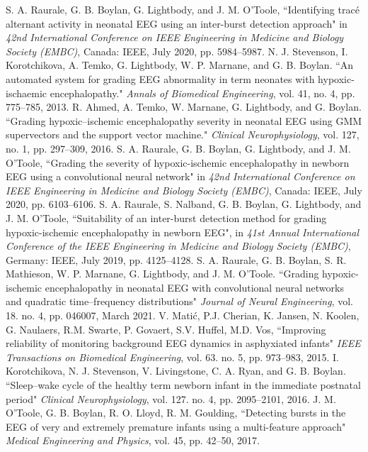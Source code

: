 \documentclass[conference]{IEEEtran}
\begin{document}
\begin{thebibliography}{99}
 S. A. Raurale, G. B. Boylan, G. Lightbody, and J. M. O'Toole, ``Identifying trac\'e alternant activity in neonatal EEG using an inter-burst detection approach" in \textit{42nd International Conference on IEEE Engineering in Medicine and Biology Society (EMBC)}, Canada: IEEE, July 2020, pp. 5984--5987.
 N. J. Stevenson, I. Korotchikova, A. Temko, G. Lightbody, W. P. Marnane, and G. B. Boylan. ``An automated system for grading EEG abnormality in term neonates with hypoxic-ischaemic encephalopathy." \textit{Annals of Biomedical Engineering}, vol. 41, no. 4, pp. 775--785, 2013.
 R. Ahmed, A. Temko, W. Marnane, G. Lightbody, and G. Boylan. ``Grading hypoxic–ischemic encephalopathy severity in neonatal EEG using GMM supervectors and the support vector machine." \textit{Clinical Neurophysiology}, vol. 127, no. 1, pp. 297--309, 2016.
 S. A. Raurale, G. B. Boylan, G. Lightbody, and J. M. O'Toole, ``Grading the severity of hypoxic-ischemic encephalopathy in newborn EEG using a convolutional neural network" in \textit{42nd International Conference on IEEE Engineering in Medicine and Biology Society (EMBC)}, Canada: IEEE, July 2020, pp. 6103--6106.
 S. A. Raurale, S. Nalband, G. B. Boylan, G. Lightbody, and J. M. O'Toole, ``Suitability of an inter-burst detection method for grading hypoxic-ischemic encephalopathy in newborn EEG", in \textit{41st Annual International Conference of the IEEE Engineering in Medicine and Biology Society (EMBC)}, Germany: IEEE, July 2019, pp. 4125--4128.
 S. A. Raurale, G. B. Boylan, S. R. Mathieson, W. P. Marnane, G. Lightbody, and J. M. O'Toole. ``Grading hypoxic-ischemic encephalopathy in neonatal EEG with convolutional neural networks and quadratic time–frequency distributions" \textit{Journal of Neural Engineering}, vol. 18. no. 4, pp. 046007, March 2021.
 V. Mati{\'c}, P.J. Cherian, K. Jansen, N. Koolen, G. Naulaers, R.M. Swarte, P. Govaert, S.V. Huffel, M.D. Vos, ``Improving reliability of monitoring background EEG dynamics in asphyxiated infants" \textit{IEEE Transactions on Biomedical Engineering}, vol. 63. no. 5, pp. 973--983, 2015.
 I. Korotchikova, N. J. Stevenson, V. Livingstone, C. A. Ryan, and G. B. Boylan. ``Sleep--wake cycle of the healthy term newborn infant in the immediate postnatal period" \textit{Clinical Neurophysiology}, vol. 127. no. 4, pp. 2095--2101, 2016.
 J. M. O’Toole, G. B. Boylan, R. O. Lloyd, R. M. Goulding, ``Detecting bursts in the EEG of very and extremely premature infants using a multi-feature approach" \textit{Medical Engineering and Physics}, vol. 45, pp. 42--50, 2017.

\end{thebibliography}
\end{document}
